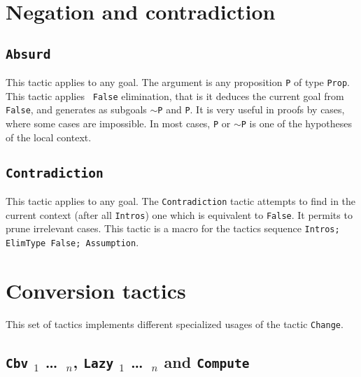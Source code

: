 \section{Negation and contradiction}

\subsection{\tt Absurd \term}
\label{Absurd}

This tactic applies to any goal. The argument {\term} is any
proposition {\tt P} of type {\tt Prop}. This tactic applies {\tt
  False} elimination, that is it deduces the current goal from {\tt
  False}, and generates as subgoals {\tt $\sim$P} and {\tt P}. It is
very useful in proofs by cases, where some cases are impossible. In
most cases, \texttt{P} or $\sim$\texttt{P} is one of the hypotheses of
the local context.

\subsection{\tt Contradiction}
\label{Contradiction}

This tactic applies to any goal. The {\tt Contradiction} tactic
attempts to find in the current context (after all {\tt Intros}) one
which is equivalent to {\tt False}. It permits to prune irrelevant
cases.  This tactic is a macro for the tactics sequence {\tt Intros;
  ElimType False; Assumption}.

\begin{ErrMsgs}
\item {}
\end{ErrMsgs}


\section{Conversion tactics}
\label{Conversion-tactics}

This set of tactics implements different specialized usages of the
tactic \texttt{Change}.


\subsection{{\tt Cbv} \flag$_1$ \dots\ \flag$_n$, {\tt Lazy} \flag$_1$
\dots\ \flag$_n$ {\rm and} {\tt Compute}}

